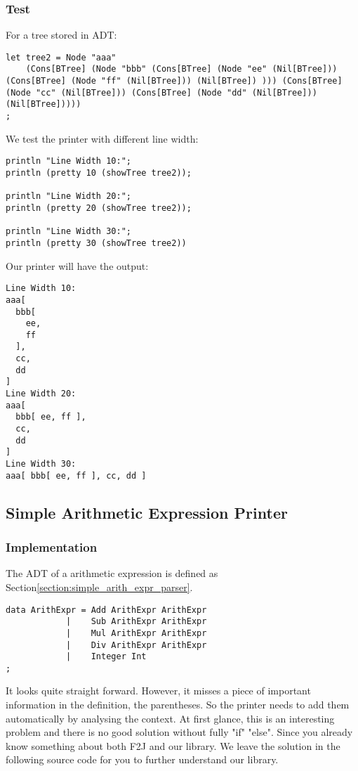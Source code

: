 \subsubsection{Test}

For a tree stored in ADT:
\begin{lstlisting}
let tree2 = Node "aaa"
    (Cons[BTree] (Node "bbb" (Cons[BTree] (Node "ee" (Nil[BTree])) (Cons[BTree] (Node "ff" (Nil[BTree])) (Nil[BTree]) ))) (Cons[BTree] (Node "cc" (Nil[BTree])) (Cons[BTree] (Node "dd" (Nil[BTree])) (Nil[BTree]))))
;
\end{lstlisting}

We test the printer with different line width:
\begin{lstlisting}
println "Line Width 10:";
println (pretty 10 (showTree tree2));

println "Line Width 20:";
println (pretty 20 (showTree tree2));

println "Line Width 30:";
println (pretty 30 (showTree tree2))
\end{lstlisting}

Our printer will have the output:
\begin{lstlisting}
Line Width 10:
aaa[
  bbb[
    ee,
    ff
  ],
  cc,
  dd
]
Line Width 20:
aaa[
  bbb[ ee, ff ],
  cc,
  dd
]
Line Width 30:
aaa[ bbb[ ee, ff ], cc, dd ]
\end{lstlisting}

\subsection{Simple Arithmetic Expression Printer}

\subsubsection{Implementation}
The ADT of a arithmetic expression is defined as Section\ref{section:simple_arith_expr_parser}.
\begin{lstlisting}
data ArithExpr = Add ArithExpr ArithExpr
            |    Sub ArithExpr ArithExpr
            |    Mul ArithExpr ArithExpr
            |    Div ArithExpr ArithExpr
            |    Integer Int
;
\end{lstlisting}

It looks quite straight forward. However, it misses a piece of important information in the definition, the parentheses. So the printer needs to add them automatically by analysing the context. At first glance, this is an interesting problem and there is no good solution without fully "if" "else". Since you already know something about both F2J and our library. We leave the solution in the following source code for you to further understand our library.


